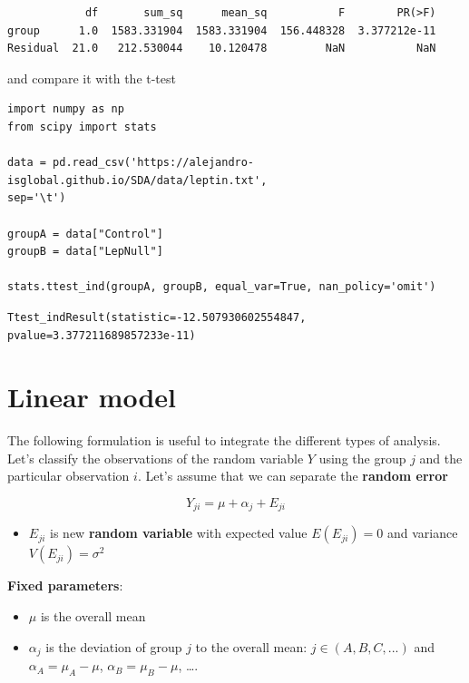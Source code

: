 \documentclass[
]{book}
\providecommand{\tightlist}{%
  \setlength{\itemsep}{0pt}\setlength{\parskip}{0pt}}
\begin{document}
\begin{verbatim}
            df       sum_sq      mean_sq           F        PR(>F)
group      1.0  1583.331904  1583.331904  156.448328  3.377212e-11
Residual  21.0   212.530044    10.120478         NaN           NaN
\end{verbatim}

and compare it with the t-test

\begin{verbatim}
import numpy as np
from scipy import stats

data = pd.read_csv('https://alejandro-isglobal.github.io/SDA/data/leptin.txt', 
sep='\t')

groupA = data["Control"]
groupB = data["LepNull"]

stats.ttest_ind(groupA, groupB, equal_var=True, nan_policy='omit')
\end{verbatim}

\begin{verbatim}
Ttest_indResult(statistic=-12.507930602554847, pvalue=3.377211689857233e-11)
\end{verbatim}

\hypertarget{linear-model}{%
\section{Linear model}\label{linear-model}}

The following formulation is useful to integrate the different types of analysis. Let's classify the observations of the random variable \(Y\) using the group \(j\) and the particular observation \(i\). Let's assume that we can separate the \textbf{random error}

\[Y_{ji} = \mu + \alpha_j +E_{ji}\]

\begin{itemize}
\tightlist
\item
  \(E_{ji}\) is new \textbf{random variable} with expected value \(E(E_{ji})=0\) and variance \(V(E_{ji})=\sigma^2\)
\end{itemize}

\textbf{Fixed parameters}:

\begin{itemize}
\tightlist
\item
  \(\mu\) is the overall mean
\item
  \(\alpha_j\) is the deviation of group \(j\) to the overall mean: \(j \in (A,B, C, ...)\) and \(\alpha_A=\mu_A-\mu\), \(\alpha_B=\mu_B-\mu\), \ldots.
\end{itemize}
\end{document}
